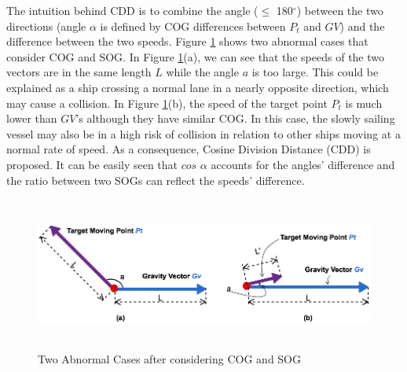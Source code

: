 \documentclass[12pt,glossary]{dalcsthesis}
\begin{document}





The intuition behind CDD is to combine the angle ($\leq$ 180$^\circ$) between the two directions (angle $\alpha$ is defined by COG differences between $P_t$ and $GV$) and the difference between the two speeds. Figure \ref{fig:abnormal_cogsog} shows two abnormal cases that consider COG and SOG. In Figure \ref{fig:abnormal_cogsog}(a), we can see that the speeds of the two vectors are in the same length $L$ while the angle $a$ is too large. This could be explained as a ship crossing a normal lane in a nearly opposite direction, which may cause a collision. In Figure \ref{fig:abnormal_cogsog}(b), the speed of the target point $P_t$ is much lower than $GV$'s although they have similar COG. In this case, the slowly sailing vessel may also be in a high risk of collision in relation to other ships moving at a normal rate of speed. As a consequence, Cosine Division Distance (CDD) is proposed. It can be easily seen that $cos$ $\alpha$ accounts for the angles' difference and the ratio between two SOGs can reflect the speeds' difference. 

\begin{figure}[!htb]
\centering
\includegraphics[width=14cm,height=5cm]{abnormalSpeedDirection.png}
\caption{Two Abnormal Cases after considering COG and SOG}
\label{fig:abnormal_cogsog}
\end{figure}
\end{document}
